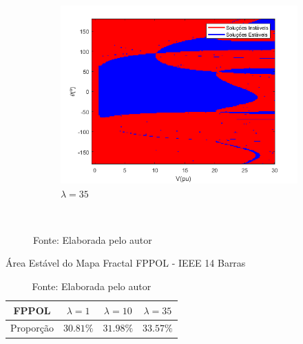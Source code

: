 \begin{figure}[H]
\begin{subfigure}[b]{0.45\textwidth}
        \centering
        \includegraphics[width=\textwidth]{textuais/capitulo4/figuras/fp_pol_20lambda.png}
        \caption{$\lambda=35$}
    \end{subfigure}
        \\
   \caption*{Fonte: Elaborada pelo autor}
   \label{fig:FPPOL-14}
\end{figure}

\begin{table}[H]
    \centering
    \caption{Área Estável do Mapa Fractal FPPOL - IEEE 14 Barras}
    \begin{tabular}{c c c c}
        \toprule
        FPPOL & $\lambda = 1$ & $\lambda = 10$ & $\lambda = 35$ \\
        \midrule
        Proporção & $30.81\%$ & $31.98\%$ & $33.57\%$\\
        \bottomrule
    \end{tabular}
    \caption*{Fonte: Elaborada pelo autor}
    \label{tabela_fractal_FPPOL_14}
\end{table}

